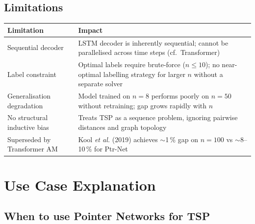 \documentclass[12pt,a4paper]{article}
\begin{document}
\subsection*{Limitations}

\begin{center}
\begin{tabularx}{\linewidth}{lX}
\toprule
\textbf{Limitation} & \textbf{Impact} \\
\midrule
Sequential decoder & LSTM decoder is inherently sequential; cannot be
  parallelised across time steps (cf.\ Transformer) \\
Label constraint & Optimal labels require brute-force ($n \leq 10$); no
  near-optimal labelling strategy for larger $n$ without a separate solver \\
Generalisation degradation & Model trained on $n = 8$ performs poorly on
  $n = 50$ without retraining; gap grows rapidly with $n$ \\
No structural inductive bias & Treats TSP as a sequence problem, ignoring
  pairwise distances and graph topology \\
Superseded by Transformer AM & Kool \textit{et al.} (2019) achieves
  $\sim$1\,\% gap on $n = 100$ vs $\sim$8--10\,\% for Ptr-Net \\
\bottomrule
\end{tabularx}
\end{center}

\section{Use Case Explanation}

\subsection*{When to use Pointer Networks for TSP}
\end{document}
